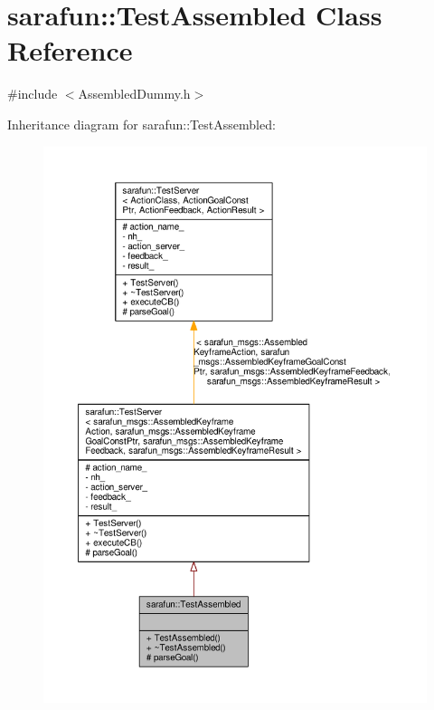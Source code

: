 \hypertarget{classsarafun_1_1TestAssembled}{\section{sarafun\-:\-:Test\-Assembled Class Reference}
\label{classsarafun_1_1TestAssembled}
}


{\ttfamily \#include $<$Assembled\-Dummy.\-h$>$}



Inheritance diagram for sarafun\-:\-:Test\-Assembled\-:\nopagebreak
\begin{figure}[H]
\begin{center}
\leavevmode
\includegraphics[width=350pt]{d4/d6a/classsarafun_1_1TestAssembled__inherit__graph}
\end{center}
\end{figure}



